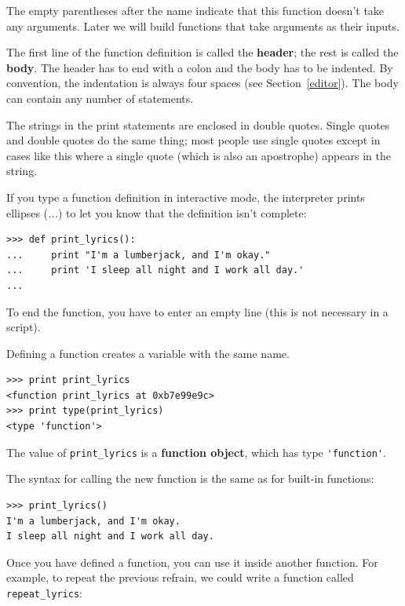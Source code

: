 \documentclass[10pt]{book}
\begin{document}

The empty parentheses after the name indicate that this function
doesn't take any arguments.   Later we will build functions that 
take arguments as their inputs.


The first line of the function definition is called the {\bf header};
the rest is called the {\bf body}.  The header has to end with a colon
and the body has to be indented.  By convention, the indentation is
always four spaces (see Section~\ref{editor}).  The body can contain
any number of statements.

The strings in the print statements are enclosed in double
quotes.  Single quotes and double quotes do the same thing;
most people use single quotes except in cases like this where
a single quote (which is also an apostrophe) appears in the string.


If you type a function definition in interactive mode, the interpreter
prints ellipses (\emph{...}) to let you know that the definition
isn't complete:

\beforeverb
\begin{verbatim}
>>> def print_lyrics():
...     print "I'm a lumberjack, and I'm okay."
...     print 'I sleep all night and I work all day.'
...
\end{verbatim}
\afterverb
%
To end the function, you have to enter an empty line (this is
not necessary in a script).

Defining a function creates a variable with the same name.

\beforeverb
\begin{verbatim}
>>> print print_lyrics
<function print_lyrics at 0xb7e99e9c>
>>> print type(print_lyrics)
<type 'function'>
\end{verbatim}
\afterverb
%
The value of \verb"print_lyrics" is a {\bf function object}, which
has type \verb"'function'".


The syntax for calling the new function is the same as
for built-in functions:

\beforeverb
\begin{verbatim}
>>> print_lyrics()
I'm a lumberjack, and I'm okay.
I sleep all night and I work all day.
\end{verbatim}
\afterverb
%
Once you have defined a function, you can use it inside another
function.  For example, to repeat the previous refrain, we could write
a function called \verb"repeat_lyrics":
\end{document}
